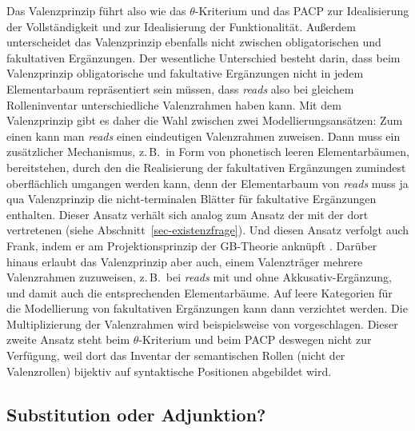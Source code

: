 Das Valenzprinzip führt also wie das $\theta$-Kriterium und das PACP zur Idealisierung der Vollständigkeit und zur Idealisierung der Funktionalität. Außerdem unterscheidet das Valenzprinzip ebenfalls nicht zwischen obligatorischen und fakultativen Ergänzungen. Der wesentliche Unterschied besteht darin, dass beim Valenzprinzip obligatorische und fakultative Ergänzungen nicht in jedem Elementarbaum repräsentiert sein müssen, dass \textit{reads} also bei gleichem Rolleninventar unterschiedliche Valenzrahmen haben kann. Mit dem Valenzprinzip gibt es daher die Wahl zwischen zwei Modellierungsansätzen: Zum einen kann man {\it reads} einen eindeutigen Valenzrahmen zuweisen. Dann muss ein zusätzlicher Mechanismus, z.\,B.\ in Form von phonetisch leeren Elementarbäumen, bereitstehen, durch den die Realisierung der fakultativen Ergänzungen zumindest oberflächlich umgangen werden kann, denn der Elementarbaum von \textit{reads} muss ja qua Valenzprinzip die nicht-terminalen Blätter für fakultative Ergänzungen enthalten. Dieser Ansatz verhält sich analog zum Ansatz der  mit der dort vertretenen  (siehe Abschnitt~\ref{sec-existenzfrage}). Und diesen Ansatz verfolgt auch Frank, indem er am Projektionsprinzip der GB-Theorie anknüpft \citep[64]{Frank:02}. Darüber hinaus erlaubt das Valenzprinzip aber auch, einem Valenzträger mehrere Valenzrahmen zuzuweisen, z.\,B.\ bei \textit{reads} mit und ohne Akkusativ-Ergänzung, und damit auch die entsprechenden Elementarbäume. Auf leere Kategorien für die Modellierung von fakultativen Ergänzungen kann dann verzichtet werden. Die Multiplizierung der Valenzrahmen wird beispielsweise von \cite{Jacobs:94a} vorgeschlagen. Dieser zweite Ansatz steht beim $\theta$-Kriterium und beim PACP deswegen nicht zur Verfügung, weil dort das Inventar der semantischen Rollen (nicht der Valenzrollen) bijektiv auf syntaktische Positionen abgebildet wird.





\subsection{Substitution oder Adjunktion?} \label{sec-ableitungsbaum}

